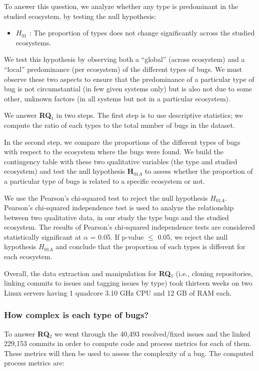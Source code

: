 To answer this question, we analyze whether any type is predominant in the studied ecosystem, by testing the null hypothesis:

\begin{itemize}
	\item $H_{01}$ : The proportion of types does not
change significantly across the studied ecosystems.
\end{itemize}

We test this hypothesis by observing both a ``global'' (across ecosystem) and a ``local'' predominance (per ecosystem) of the different types of bugs.
We must observe these two aspects to ensure that the predominance of a particular type of bug is not circumstantial (in few given systems only) but is also not due to some other, unknown factors (in all systems but not in a particular ecosystem).

We answer {\bf RQ$_1$} in two steps.
The first step is to use descriptive statistics; we compute the ratio of each types to the total number of bugs in the dataset.

In the second step, we compare the proportions of the different types of bugs with respect to the ecosystem where the bugs were found.
We build the contingency table with these two qualitative variables (the type and studied ecosystem) and test the null hypothesis {\bf H$_{01A}$} to assess whether the proportion of a particular type of bugs is related to a specific ecosystem or not.

We use the Pearson's chi-squared test to reject the null hypothesis $H_{01A}$.
Pearson's chi-squared independence test is used to analyze the relationship between two qualitative data, in our study the type bugs and the studied ecosystem.
The results of Pearson's chi-squared independence tests are considered
statistically significant at $\alpha$ = 0.05.
If p-value $\le$ 0.05, we reject the null hypothesis $H_{01A}$ and conclude that the proportion of each types is different for each ecosystem.

Overall, the data extraction and manipulation for {\bf RQ$_1$} (i.e., cloning repositories, linking commits to issues and tagging issues by type) took thirteen weeks on two Linux servers having 1 quadcore
3.10 GHz CPU and 12 GB of RAM each.

\subsubsection{How complex is each type of bugs?}  To answer {\bf RQ$_2$} we went through the 40,493 resolved/fixed issues and the linked 229,153 commits in order to compute code and process metrics for each of them.
These metrics will then be used to assess the complexity of a bug.
The computed process metrics are:

